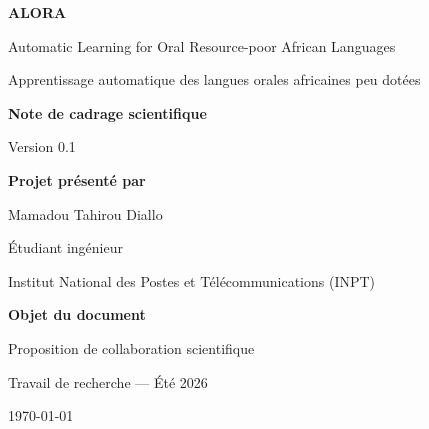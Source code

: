 \documentclass[11pt,a4paper]{article}
\begin{document}

\begin{titlepage}

\centering

\vspace*{1.8cm}

{\Huge\bfseries ALORA}

\vspace{0.5cm}

{\Large
Automatic Learning for Oral Resource-poor African Languages
}

\vspace{0.5cm}

{\large
Apprentissage automatique des langues orales africaines peu dotées
}

\vspace{2cm}

{\LARGE\bfseries
Note de cadrage scientifique
}

\vspace{0.3cm}

Version 0.1

\vfill

\textbf{Projet présenté par}

\vspace{0.3cm}

{\Large
Mamadou Tahirou Diallo
}

Étudiant ingénieur

Institut National des Postes et Télécommunications (INPT)

\vfill

\textbf{Objet du document}

\vspace{0.2cm}

Proposition de collaboration scientifique

Travail de recherche — Été 2026

\vfill

\today

\end{titlepage}


\tableofcontents

\newpage

\end{document}
